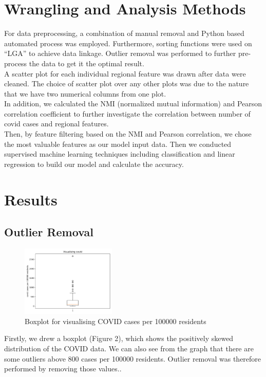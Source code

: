 \documentclass[a4, 11pt]{article}
\begin{document}
\section{Wrangling and Analysis Methods}
For data preprocessing, a combination of manual removal and Python based automated process was employed. Furthermore, sorting functions were used on “LGA” to achieve data linkage. Outlier removal was performed to further pre-process the data to get it the optimal result.
\\A scatter plot for each individual regional feature was drawn after data were cleaned. The choice of scatter plot over any other plots was due to the nature that we have two numerical columns from one plot.
\\In addition, we calculated the NMI (normalized mutual information) and Pearson correlation coefficient to further investigate the correlation between number of covid cases and regional features.
\\Then, by feature filtering based on the NMI and Pearson correlation, we chose the most valuable features as our model input data. Then we conducted supervised machine learning techniques including classification and linear regression to build our model and calculate the accuracy.



\section{Results}
\subsection{Outlier Removal}
\begin{figure}[ht]
    \centering
    \includegraphics[width=0.4\textwidth]{graph/boxplot of covid.png}
    \caption{Boxplot for visualising COVID cases per 100000 residents}
    \label{fig:my_label}
\end{figure}
Firstly, we drew a boxplot (Figure 2), which shows the positively skewed distribution of the COVID data. We can also see from the graph that there are some outliers above 800 cases per 100000 residents. Outlier removal was therefore performed by removing those values.. 
\end{document}

